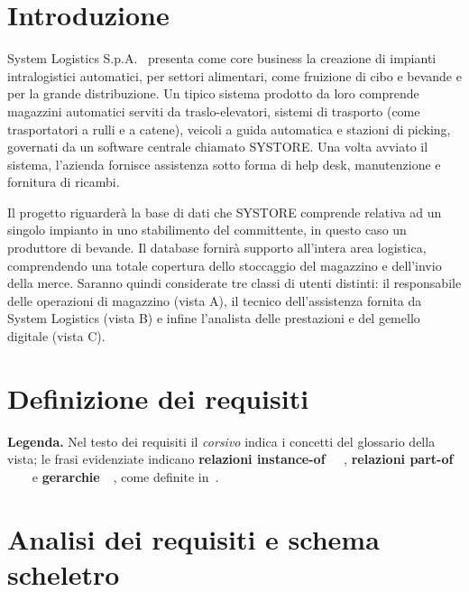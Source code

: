 \documentclass{article}
\newcommand{\concetto}[1]{\textit{#1}}
\newcommand{\etichetta}[1]{{\setlength{\fboxsep}{0.8pt}\colorbox{col#1}{\textcolor{white}{\scriptsize\bfseries #1}}}}
\newcommand{\evid}[2]{\textcolor{col#1}{\textbf{#2}}\,\etichetta{#1}}
\begin{document}


\tableofcontents
\newpage

\section*{Introduzione}
System Logistics S.p.A.~\cite{sl_web} presenta come core business la creazione di impianti intralogistici automatici, per settori alimentari, come fruizione di cibo e bevande e per la grande distribuzione. 
Un tipico sistema prodotto da loro comprende magazzini automatici serviti da traslo-elevatori, sistemi di trasporto (come trasportatori a rulli e a catene), veicoli a guida automatica e stazioni di picking, governati da un software centrale chiamato SYSTORE. 
Una volta avviato il sistema, l’azienda fornisce assistenza sotto forma di help desk, manutenzione e fornitura di ricambi.

Il progetto riguarderà la base di dati che SYSTORE comprende relativa ad un singolo impianto in uno stabilimento del committente, in questo caso un produttore di bevande. 
Il database fornirà supporto all’intera area logistica, comprendendo una totale copertura dello stoccaggio del magazzino e dell’invio della merce.
Saranno quindi considerate tre classi di utenti distinti: il responsabile delle operazioni di magazzino (vista A), il tecnico dell’assistenza fornita da System Logistics (vista B) e infine l’analista delle prestazioni e del gemello digitale (vista C).






\section{Definizione dei requisiti}
\label{sec:requisiti}
\textbf{Legenda.} Nel testo dei requisiti il \concetto{corsivo} indica i concetti del glossario della
vista; le frasi evidenziate indicano \evid{IO}{relazioni instance-of}, \evid{PO}{relazioni part-of} e
\evid{G}{gerarchie}, come definite in~\cite{atzeni2018}.





\section{Analisi dei requisiti e schema scheletro}
\label{sec:analisi}





\newpage
{}


\end{document}
